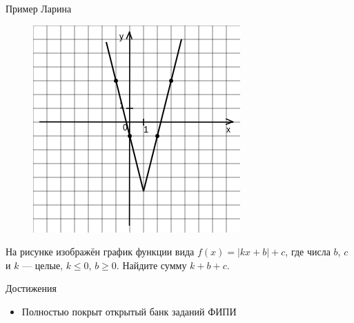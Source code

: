 \documentclass[aspectratio=169]{beamer}
\begin{document}
\begin{frame}{Пример Ларина}

    \vspace{-0.5cm}
    \begin{figure}[t]
        \includegraphics[scale=0.45]{images/453912618511153n0}
    \end{figure}
    На рисунке изображён график функции вида $f(x)=|kx+b|+c$, где числа $b$, $c$ и $k$ — целые, $k \leq 0$, $b\geq0$. Найдите сумму $k+b+c$.\vspace{2.5cm}

\end{frame}


\begin{frame}{Достижения}
    \begin{itemize}
        \item Полностью покрыт открытый банк заданий ФИПИ
    \end{itemize}
    
\end{frame}
\end{document}
